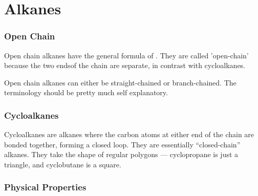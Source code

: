

\pagebreak
\hypertarget{ChapterAlkanes}{}
\part{Alkanes}

	\section{Open Chain}

		Open chain alkanes have the general formula of . They are called 'open-chain' because
		the two endsof the chain are separate, in contrast with cycloalkanes.

		Open chain alkanes can either be straight-chained or branch-chained. The terminology should be pretty much
		self explanatory.





	\section{Cycloalkanes}

		Cycloalkanes are alkanes where the carbon atoms at either end of the chain are bonded together, forming a closed loop.
		They are essentially \enquote{closed-chain} alkanes. They take the shape of regular polygons --- cyclopropane is just a triangle,
		and cyclobutane is a square.




	\pagebreak
	\section{Physical Properties}
